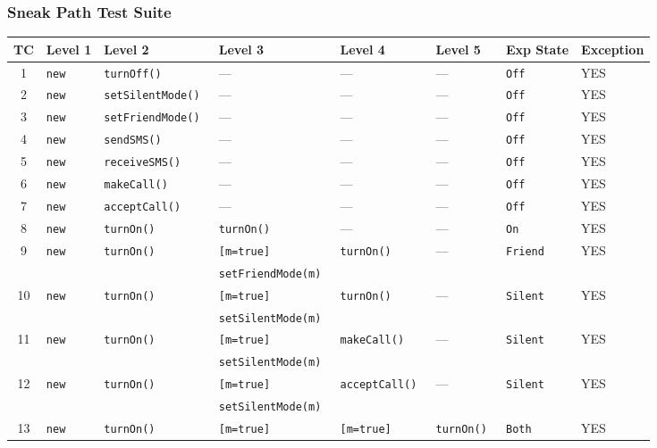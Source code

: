 \subsubsection{Sneak Path Test Suite}
\label{sec:classes.mobile.sneak}
\begin{table}[ht]
  \centering
  \scriptsize
  \begin{tabular}{|c|*{7}{l|}}
    \hline
    \textbf{TC} & \textbf{Level 1} & \textbf{Level 2} & \textbf{Level 3}
      & \textbf{Level 4} & \textbf{Level 5} & \textbf{Exp State}
      & \textbf{Exception} \\ \hline
     1 & \tt new & \tt turnOff() & --- & --- & --- & \tt Off & YES \\ \hline
     2 & \tt new & \tt setSilentMode() & --- & --- & --- & \tt Off & YES \\ \hline
     3 & \tt new & \tt setFriendMode() & --- & --- & --- & \tt Off & YES \\ \hline
     4 & \tt new & \tt sendSMS() & --- & --- & --- & \tt Off & YES \\ \hline
     5 & \tt new & \tt receiveSMS() & --- & --- & --- & \tt Off & YES \\ \hline
     6 & \tt new & \tt makeCall() & --- & --- & --- & \tt Off & YES \\ \hline
     7 & \tt new & \tt acceptCall() & --- & --- & --- & \tt Off & YES \\ \hline
     8 & \tt new & \tt turnOn() & \tt turnOn() & --- & --- & \tt On & YES \\ \hline
     9 & \tt new & \tt turnOn() & \tt [m=true] & \tt turnOn() & --- & \tt Friend & YES \\
       &         &              & \tt setFriendMode(m) &&&& \\ \hline
    10 & \tt new & \tt turnOn() & \tt [m=true] & \tt turnOn() & --- & \tt Silent & YES \\
       &         &              & \tt setSilentMode(m) &&&& \\ \hline
    11 & \tt new & \tt turnOn() & \tt [m=true] & \tt makeCall() & --- & \tt Silent & YES \\
       &         &              & \tt setSilentMode(m) &&&& \\ \hline
    12 & \tt new & \tt turnOn() & \tt [m=true] & \tt acceptCall() & --- & \tt Silent & YES \\
       &         &              & \tt setSilentMode(m) &&&& \\ \hline
    13 & \tt new & \tt turnOn() & \tt [m=true]         & \tt [m=true] & \tt turnOn() & \tt Both & YES \\

\end{tabular}
\end{table}
